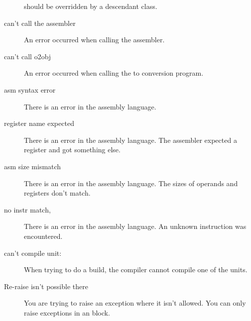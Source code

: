 \documentclass{report}
\begin{document}
\begin{description}
should be overridden by a descendant class.
\item [can't call the assembler]
An error occurred when calling the assembler.
\item [can't call o2obj]
An error occurred when calling the  to  conversion program.
\item [asm syntax error]
There is an error in the assembly language.
\item [register name expected]
There is an error in the assembly language. The assembler expected a
register and got something else.
\item [asm size mismatch]
There is an error in the assembly language. The sizes of operands and
registers don't match.
\item [no instr match,]
There is an error in the assembly language. An unknown instruction was
encountered.
\item [can't compile unit:]
When trying to do a build, the compiler cannot compile one of the units.
\item [Re-raise isn't possible there]
You are trying to raise an exception where it isn't allowed. You can only
raise exceptions in an  block.


\end{description}
\end{document}
